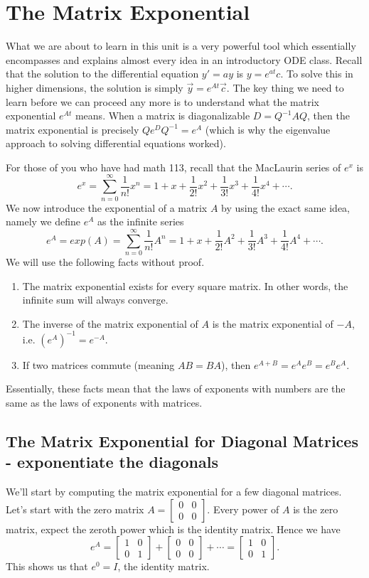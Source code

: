 \section{The Matrix Exponential}
What we are about to learn in this unit is a very powerful tool which essentially encompasses and explains almost every idea in an introductory ODE class.   Recall that the solution to the differential equation $y' = ay$ is $y=e^{at}c$. To solve this in higher dimensions, the solution is simply $\vec y=e^{At}\vec c$.  The key thing we need to learn before we can proceed any more is to understand what the matrix exponential $e^{At}$ means. When a matrix is diagonalizable $D=Q^{-1} A Q$, then the matrix exponential is precisely $Qe^{D}Q^{-1}=e^{A}$ (which is why the eigenvalue approach to solving differential equations worked).

For those of you who have had math 113, recall that the MacLaurin series of $e^x$ is
$$e^x = \sum_{n=0}^\infty \frac{1}{n!}x^n = 1+x+\frac{1}{2!}x^2+\frac{1}{3!}x^3+\frac{1}{4!}x^4+\cdots.$$
We now introduce the exponential of a matrix $A$ by using the exact same idea, namely we define $e^A$ as the infinite series
$$e^A = exp(A) = \sum_{n=0}^\infty \frac{1}{n!}A^n = 1+x+\frac{1}{2!}A^2+\frac{1}{3!}A^3+\frac{1}{4!}A^4+\cdots.$$
We will use the following facts without proof.
\begin{enumerate}
	\item The matrix exponential exists for every square matrix. In other words, the infinite sum will always converge.
	\item The inverse of the matrix exponential of $A$ is the matrix exponential of $-A$, i.e. $(e^A)^{-1}=e^{-A}$. 
	\item If two matrices commute (meaning $AB=BA$), then  $e^{A+B}=e^Ae^B = e^Be^A$.
\end{enumerate}
Essentially, these facts mean that the laws of exponents with numbers are the same as the laws of exponents with matrices.


\subsection{The Matrix Exponential for Diagonal Matrices - exponentiate the diagonals}
We'll start by computing the matrix exponential for a few diagonal matrices.  Let's start with the zero matrix
$A=
\begin{bmatrix}
 0 & 0 \\
 0 & 0
	\end{bmatrix}
$. 
 Every power of $A$ is the zero matrix, expect the zeroth power which is the identity matrix.  Hence we have
$$e^A = 
\begin{bmatrix}
 1 & 0 \\
 0 & 1
	\end{bmatrix}
+
\begin{bmatrix}
 0 & 0 \\
 0 & 0
	\end{bmatrix}
+\cdots = 
\begin{bmatrix}
 1 & 0 \\
 0 & 1
	\end{bmatrix}
.$$
This shows us that $e^{0} = I$, the identity matrix.

